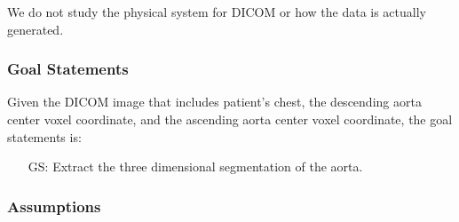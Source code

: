 \documentclass[12pt]{article}
\newcounter{goalnum} %
\begin{document}
We do not study the physical system for DICOM or how the data is actually generated.







\subsubsection{Goal Statements}


\noindent Given the DICOM image that includes patient's chest,
the descending aorta center voxel coordinate,
and the ascending aorta center voxel coordinate, the goal statements is:

\begin{itemize}

\item[GS\refstepcounter{goalnum}\thegoalnum \label{Gsegment}:] 
Extract the three dimensional segmentation of the aorta.

\end{itemize}


\subsubsection{Assumptions} \label{sec_assumpt}
\end{document}

